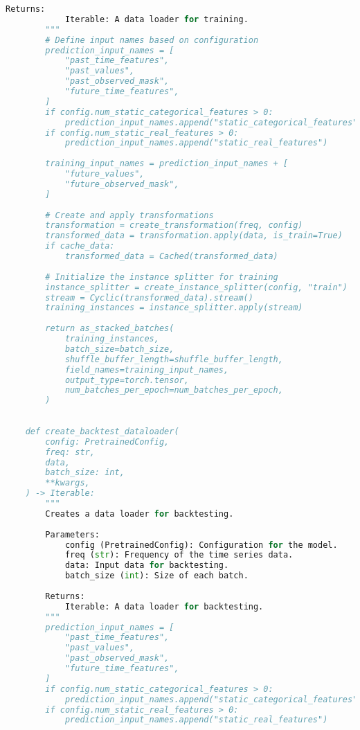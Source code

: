 \begin{lstlisting}[language=Python, caption={Code for creating data loaders for efficient training and evaluation}, breaklines=true, label=code4]
        Returns:
            Iterable: A data loader for training.
        """
        # Define input names based on configuration
        prediction_input_names = [
            "past_time_features",
            "past_values",
            "past_observed_mask",
            "future_time_features",
        ]
        if config.num_static_categorical_features > 0:
            prediction_input_names.append("static_categorical_features")
        if config.num_static_real_features > 0:
            prediction_input_names.append("static_real_features")
    
        training_input_names = prediction_input_names + [
            "future_values",
            "future_observed_mask",
        ]
    
        # Create and apply transformations
        transformation = create_transformation(freq, config)
        transformed_data = transformation.apply(data, is_train=True)
        if cache_data:
            transformed_data = Cached(transformed_data)
    
        # Initialize the instance splitter for training
        instance_splitter = create_instance_splitter(config, "train")
        stream = Cyclic(transformed_data).stream()
        training_instances = instance_splitter.apply(stream)
    
        return as_stacked_batches(
            training_instances,
            batch_size=batch_size,
            shuffle_buffer_length=shuffle_buffer_length,
            field_names=training_input_names,
            output_type=torch.tensor,
            num_batches_per_epoch=num_batches_per_epoch,
        )
    
    
    def create_backtest_dataloader(
        config: PretrainedConfig,
        freq: str,
        data,
        batch_size: int,
        **kwargs,
    ) -> Iterable:
        """
        Creates a data loader for backtesting.
    
        Parameters:
            config (PretrainedConfig): Configuration for the model.
            freq (str): Frequency of the time series data.
            data: Input data for backtesting.
            batch_size (int): Size of each batch.
    
        Returns:
            Iterable: A data loader for backtesting.
        """
        prediction_input_names = [
            "past_time_features",
            "past_values",
            "past_observed_mask",
            "future_time_features",
        ]
        if config.num_static_categorical_features > 0:
            prediction_input_names.append("static_categorical_features")
        if config.num_static_real_features > 0:
            prediction_input_names.append("static_real_features")
    

\end{lstlisting}
